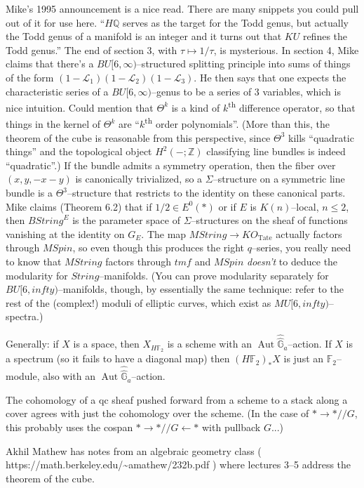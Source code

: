\documentclass[12pt]{book}
\newcommand{\Z}{\mathbb Z}
\newcommand{\F}{\mathbb F}
\newcommand{\G}{\widehat{\mathbb G}}
\newcommand{\Q}{\mathbb{Q}}
\renewcommand{\L}{\mathcal{L}}
\newcommand{\<}{\langle}
\renewcommand{\>}{\rangle}
\newcommand{\mmod}{/\!\!/}
\renewcommand{\th}{\textsuperscript{th}}
\newcommand{\Spin}{\mathit{Spin}}
\newcommand{\String}{\mathit{String}}
\newcommand{\tmf}{\mathit{tmf}}
\newcommand{\Tate}{\mathrm{Tate}}
\DeclareMathOperator{\Aut}{Aut}
\numberwithin{equation}{section}
\theoremstyle{plain}
\theoremstyle{definition}
\theoremstyle{remark}
\begin{document}
Mike's 1995 announcement is a nice read. There are many snippets you could pull out of it for use here. ``$H\Q$ serves as the target for the Todd genus, but actually the Todd genus of a manifold is an integer and it turns out that $KU$ refines the Todd genus.''  The end of section 3, with $\tau \mapsto 1/\tau$, is mysterious.  In section 4, Mike claims that there's a $BU[6, \infty)$--structured splitting principle into sums of things of the form $(1 - \L_1)(1 - \L_2)(1 - \L_3)$.  He then says that one expects the characteristic series of a $BU[6, \infty)$--genus to be a series of $3$ variables, which is nice intuition.  Could mention that $\Theta^k$ is a kind of $k${\th} difference operator, so that things in the kernel of $\Theta^k$ are ``$k${\th} order polynomials''.  (More than this, the theorem of the cube is reasonable from this perspective, since $\Theta^3$ kills ``quadratic things'' and the topological object $H^2(-; \Z)$ classifying line bundles is indeed ``quadratic''.)  If the bundle admits a symmetry operation, then the fiber over $(x, y, -x-y)$ is canonically trivialized, so a $\Sigma$--structure on a symmetric line bundle is a $\Theta^3$--structure that restricts to the identity on these canonical parts.  Mike claims (Theorem 6.2) that if $1/2 \in E^0(*)$ or if $E$ is $K(n)$--local, $n \le 2$, then $B\String^E$ is the parameter space of $\Sigma$--structures on the sheaf of functions vanishing at the identity on $G_E$.  The map $M\String \to KO_{\Tate}$ actually factors through $M\Spin$, so even though this produces the right $q$--series, you really need to know that $M\String$ factors through $\tmf$ and $M\Spin$ \emph{doesn't} to deduce the modularity for $\String$--manifolds.  (You can prove modularity separately for $BU[6, infty)$--manifolds, though, by essentially the same technique: refer to the rest of the (complex!) moduli of elliptic curves, which exist as $MU[6, infty)$--spectra.)

Generally: if $X$ is a space, then $X_{H\F_2}$ is a scheme with an $\Aut \widehat \G_a$--action. If $X$ is a spectrum (so it fails to have a diagonal map) then $(H\F_2)_* X$ is just an $\F_2$--module, also with an $\Aut \widehat \G_a$--action.

The cohomology of a qc sheaf pushed forward from a scheme to a stack along a cover agrees with just the cohomology over the scheme. (In the case of $* \to * \mmod G$, this probably uses the cospan $* \to * \mmod G \leftarrow *$ with pullback $G$...)

Akhil Mathew has notes from an algebraic geometry class ( https://math.berkeley.edu/{\textasciitilde}amathew/232b.pdf ) where lectures 3--5 address the theorem of the cube.
\end{document}
